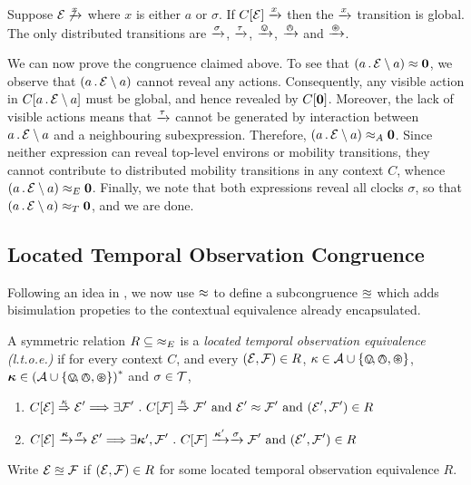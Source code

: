 \documentclass[orivec,envcountsame]{llncs}
\begin{document}
\begin{proposition}
Suppose $\text{$\mathcal{E}$} \not\xrightarrow{x}$ where $x$ is either $a$ or $\sigma$. If
$C[\text{$\mathcal{E}$}] \xrightarrow{x}$ then the $\xrightarrow{x}$ transition is global.
The only distributed transitions are $\xrightarrow{\sigma}$, $\xrightarrow{\tau}$,
$\xrightarrow{\varovee}$, $\xrightarrow{\varowedge}$ and $\xrightarrow{\varoast}$.
\end{proposition}

We can now prove the congruence claimed above. To see that $\left(a\,.\,\text{$\mathcal{E}$}
\setminus {a}\right) \approx \textbf{0}$, we observe that $\left(a\,.\,\text{$\mathcal{E}$} \setminus {a}\right)$
cannot reveal any actions. Consequently, any visible action in $C[a\,.\,\text{$\mathcal{E}$}
\setminus {a}]$ must be global, and hence revealed by $C[\textbf{0}]$. Moreover, the lack of
visible actions means that $\xrightarrow{\tau}$ cannot be generated by interaction
between $a\,.\,\text{$\mathcal{E}$} \setminus {a}$ and a neighbouring subexpression. Therefore,
$\left(a\,.\,\text{$\mathcal{E}$} \setminus {a}\right) \mathrel{\approx_{A}} \textbf{0}$. Since neither expression can
reveal top-level environs or mobility transitions, they cannot contribute to
distributed mobility transitions in any context $C$, whence $\left(a\,.\,\text{$\mathcal{E}$}
\setminus {a}\right) \mathrel{\approx_{E}} \textbf{0}$. Finally, we note that both expressions reveal all
clocks $\sigma$, so that $\left(a\,.\,\text{$\mathcal{E}$} \setminus {a}\right) \mathrel{\approx_{T}} \textbf{0}$, and we
are done.


\subsection{Located Temporal Observation Congruence}
\label{sec:ltoc}

Following an idea in \cite{case}, we now use $\approx$ to define a
subcongruence $\approxeq$ which adds bisimulation propeties to the
contextual equivalence already encapsulated.

\begin{definition}

A symmetric relation $R\mathrel{\subseteq}\mathop{\mathrel{\approx_{E}}}$ is a
\emph{located temporal observation equivalence (l.t.o.e.)} if for every
context $C$, and every $(\text{$\mathcal{E}$},\text{$\mathcal{F}$}) \in R$, $\kappa \in \text{$\mathcal{A}$} \cup
\{ \varovee\!, \varowedge , \varoast \}$, $\vec{\kappa} \in \left(\actions \cup
\{ \tntin, \tntout, \tntopen \}\right)^*$ and $\sigma \in \text{$\mathcal{T}$}$,

\begin{enumerate}
\item
    $C[\text{$\mathcal{E}$}] \stackrel{\kappa}{\Rightarrow} \text{$\mathcal{E}$}' \Longrightarrow 
       \exists \text{$\mathcal{F}$}' ~.~ C[\text{$\mathcal{F}$}] \stackrel{\kappa}{\Rightarrow} \text{$\mathcal{F}$}' \mbox{ and } \text{$\mathcal{E}$}' \approx \text{$\mathcal{F}$}' \mbox{ and } (\text{$\mathcal{E}$}', \text{$\mathcal{F}$}') \in R$ 
\item
    $C[\expr] \Does{\vec{\kappa}}\Does{\sigma} \expr' \Longrightarrow
       \exists \vec{\kappa}', \exprb' ~.~ 
       C[\exprb] \Does{\vec{\kappa}'}\Does{\sigma} \exprb' \mbox{ and } (\expr', \exprb') \in R$
\end{enumerate}
Write $\text{$\mathcal{E}$} \approxeq \text{$\mathcal{F}$}$ if $(\text{$\mathcal{E}$},\text{$\mathcal{F}$}) \in R$ for some located temporal observation
equivalence $R$.
\end{definition}
\end{document}
